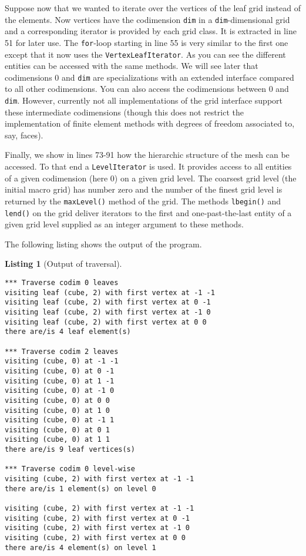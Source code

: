 \documentclass[11pt,a4paper,headinclude,footinclude,DIV14,BCOR8.25mm,titlepage,twoside,openright,normalheadings]{scrreprt}
\newtheorem{lst}{Listing}
\begin{document}
Suppose now that we wanted to iterate over the vertices of the leaf
grid instead of the elements. Now vertices have the codimension
\lstinline!dim! in a \lstinline!dim!-dimensional grid and a
corresponding iterator is provided by each grid class. It is extracted
in line 51 for later use. The \lstinline!for!-loop starting in line 55
is very similar to the first one except that it now uses the
\lstinline!VertexLeafIterator!.  
As you can see the different entities can be accessed with the same
methods. We will see later that codimensions 0 and \lstinline!dim! are
specializations with an extended interface compared to all other
codimensions. You can also access the codimensions between 0 and
\lstinline!dim!. However, currently not all implementations of the
grid interface support these intermediate codimensions (though this
does not restrict the implementation of finite element methods with
degrees of freedom associated to, say, faces).

Finally, we show in lines 73-91 how the hierarchic structure of the
mesh can be accessed. To that end a \lstinline!LevelIterator! is
used. It provides access to all entities of a given codimension (here
0) on a given grid level. The coarsest grid level (the initial macro
grid) has number zero and the number of the finest grid level is
returned by the \lstinline!maxLevel()! method of the grid. 
The methods \lstinline!lbegin()! and \lstinline!lend()! on the grid
deliver iterators to the first and one-past-the-last entity of a given
grid level supplied as an integer argument to these methods. 

The following listing shows the output of the program.

\begin{lst}[Output of traversal] \mbox{}

\begin{lstlisting}[basicstyle=\ttfamily\scriptsize]
*** Traverse codim 0 leaves
visiting leaf (cube, 2) with first vertex at -1 -1
visiting leaf (cube, 2) with first vertex at 0 -1
visiting leaf (cube, 2) with first vertex at -1 0
visiting leaf (cube, 2) with first vertex at 0 0
there are/is 4 leaf element(s)

*** Traverse codim 2 leaves
visiting (cube, 0) at -1 -1
visiting (cube, 0) at 0 -1
visiting (cube, 0) at 1 -1
visiting (cube, 0) at -1 0
visiting (cube, 0) at 0 0
visiting (cube, 0) at 1 0
visiting (cube, 0) at -1 1
visiting (cube, 0) at 0 1
visiting (cube, 0) at 1 1
there are/is 9 leaf vertices(s)

*** Traverse codim 0 level-wise
visiting (cube, 2) with first vertex at -1 -1
there are/is 1 element(s) on level 0

visiting (cube, 2) with first vertex at -1 -1
visiting (cube, 2) with first vertex at 0 -1
visiting (cube, 2) with first vertex at -1 0
visiting (cube, 2) with first vertex at 0 0
there are/is 4 element(s) on level 1
\end{lstlisting}
\end{lst}
\end{document}
